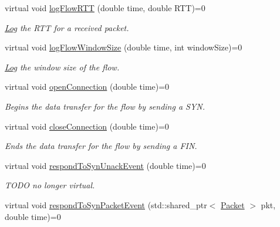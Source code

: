 \begin{DoxyCompactItemize}
virtual void \hyperlink{classFlow_a4e819e83edb2b9b90f647e6c43e28b8e}{log\-Flow\-R\-T\-T} (double time, double \-R\-T\-T)=0
\begin{DoxyCompactList}\small\item\em \hyperlink{classLog}{\-Log} the \-R\-T\-T for a received packet. \end{DoxyCompactList}\item 
virtual void \hyperlink{classFlow_a777477d26afb220c96de8495e85e73ef}{log\-Flow\-Window\-Size} (double time, int window\-Size)=0
\begin{DoxyCompactList}\small\item\em \hyperlink{classLog}{\-Log} the window size of the flow. \end{DoxyCompactList}\item 
virtual void \hyperlink{classFlow_aedfba46ffa2ea5e12ed953174d29380f}{open\-Connection} (double time)=0
\begin{DoxyCompactList}\small\item\em \-Begins the data transfer for the flow by sending a \-S\-Y\-N. \end{DoxyCompactList}\item 
virtual void \hyperlink{classFlow_a8ebd328c963fef5e538a3d6ea91ee317}{close\-Connection} (double time)=0
\begin{DoxyCompactList}\small\item\em \-Ends the data transfer for the flow by sending a \-F\-I\-N. \end{DoxyCompactList}\item 
\hypertarget{classFlow_a3c3884b1b36915274c3c15934f7e6d2a}{virtual void \hyperlink{classFlow_a3c3884b1b36915274c3c15934f7e6d2a}{respond\-To\-Syn\-Unack\-Event} (double time)=0}\label{classFlow_a3c3884b1b36915274c3c15934f7e6d2a}

\begin{DoxyCompactList}\small\item\em \-T\-O\-D\-O no longer virtual. \end{DoxyCompactList}\item 
\hypertarget{classFlow_a1b9f70de92594ba82c5a1b16298f3811}{virtual void \hyperlink{classFlow_a1b9f70de92594ba82c5a1b16298f3811}{respond\-To\-Syn\-Packet\-Event} (std\-::shared\-\_\-ptr$<$ \hyperlink{classPacket}{\-Packet} $>$ pkt, double time)=0}\label{classFlow_a1b9f70de92594ba82c5a1b16298f3811}


\end{DoxyCompactItemize}
